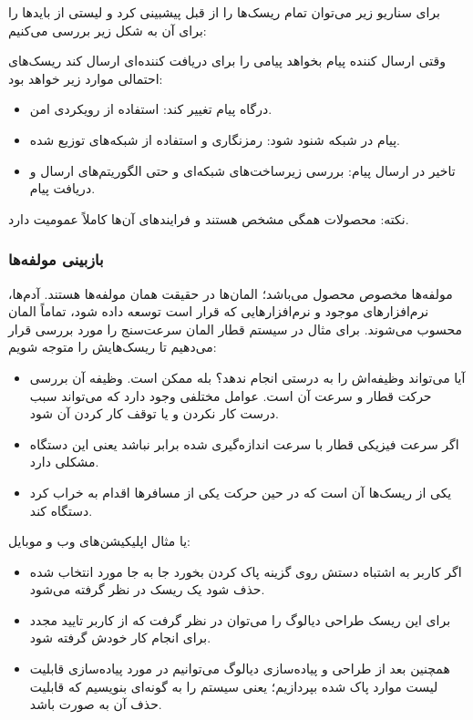 برای سناریو زیر می‌توان تمام ریسک‌ها را از قبل پیشبینی کرد و لیستی از باید‌ها را
برای آن به شکل زیر بررسی می‌کنیم:

وقتی ارسال کننده پیام بخواهد پیامی را برای دریافت کننده‌ای ارسال کند ریسک‌های
احتمالی موارد زیر خواهد بود:

\begin{itemize}
    \item درگاه پیام تغییر کند: استفاده از رویکردی امن.
    \item پیام در شبکه شنود شود: رمزنگاری و استفاده از شبکه‌های توزیع شده.
    \item تاخیر در ارسال پیام: بررسی زیرساخت‌های شبکه‌ای و حتی الگوریتم‌های
    ارسال و دریافت پیام.
\end{itemize}

نکته: محصولات همگی مشخص هستند و فرایند‌های آن‌ها کاملاً عمومیت دارد.

\subsubsection{بازبینی مولفه‌ها}

مولفه‌ها مخصوص محصول می‌باشد؛ المان‌ها در حقیقت همان مولفه‌ها هستند. آدم‌ها،
نرم‌افزار‌های موجود و نرم‌افزار‌هایی که قرار است توسعه داده شود، تماماً المان
محسوب می‌شوند. برای مثال در سیستم قطار المان سرعت‌سنج را مورد بررسی قرار می‌دهیم
تا ریسک‌هایش را متوجه شویم:

\begin{itemize}
    \item آیا می‌تواند وظیفه‌اش را به درستی انجام ندهد؟ بله ممکن است. وظیفه‌ آن
    بررسی حرکت قطار و سرعت آن است. عوامل مختلفی وجود دارد که می‌تواند سبب درست
    کار نکردن و یا توقف کار کردن آن شود.
    \item اگر سرعت فیزیکی قطار با سرعت اندازه‌گیری شده برابر نباشد یعنی این
    دستگاه مشکلی دارد.
    \item یکی از ریسک‌ها آن است که در حین حرکت یکی از مسافر‌ها اقدام به خراب کرد
    دستگاه کند.
\end{itemize}

یا مثال اپلیکیشن‌های وب و موبایل:

\begin{itemize}
    \item اگر کاربر به اشتباه دستش روی گزینه پاک کردن بخورد جا به جا مورد انتخاب
    شده حذف شود یک ریسک در نظر گرفته می‌شود.
    \item برای این ریسک طراحی دیالوگ را می‌توان در نظر گرفت که از کاربر تایید مجدد
    برای انجام کار خودش گرفته شود.
    \item همچنین بعد از طراحی و پیاده‌سازی دیالوگ می‌توانیم در مورد پیاده‌سازی
    قابلیت لیست موارد پاک شده بپردازیم؛ یعنی سیستم را به گونه‌ای بنویسیم که
    قابلیت حذف آن به صورت  باشد.
\end{itemize}

